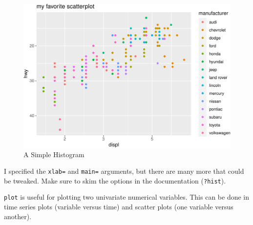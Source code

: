 \documentclass[
  12pt,
  krantz2]{krantz}
\makeatletter
\newenvironment{Shaded}{\begin{snugshade}}{\end{snugshade}}
\newcommand{\AttributeTok}[1]{\textcolor[rgb]{0.61,0.61,0.61}{#1}}
\newcommand{\DecValTok}[1]{\textcolor[rgb]{0.06,0.06,0.06}{#1}}
\newcommand{\FunctionTok}[1]{\textcolor[rgb]{0,0,0}{#1}}
\newcommand{\NormalTok}[1]{#1}
\newcommand{\SpecialCharTok}[1]{\textcolor[rgb]{0,0,0}{#1}}
\newcommand{\StringTok}[1]{\textcolor[rgb]{0.5,0.5,0.5}{#1}}
\newenvironment{kframe}{%
\medskip{}
\setlength{\fboxsep}{.8em}
 \def\at@end@of@kframe{}%
 \ifinner\ifhmode%
  \def\at@end@of@kframe{\end{minipage}}%
  \begin{minipage}{\columnwidth}%
 \fi\fi%
 \def\FrameCommand##1{\hskip\@totalleftmargin \hskip-\fboxsep
 \colorbox{shadecolor}{##1}\hskip-\fboxsep
     \hskip-\linewidth \hskip-\@totalleftmargin \hskip\columnwidth}%
 \MakeFramed {\advance\hsize-\width
   \@totalleftmargin\z@ \linewidth\hsize
   \@setminipage}}%
 {\par\unskip\endMakeFramed%
 \at@end@of@kframe}
\renewenvironment{Shaded}{\begin{kframe}}{\end{kframe}}
\makeatother
\begin{document}
\begin{figure}
\centering
\includegraphics{r_and_python_book_files/figure-latex/unnamed-chunk-196-1.pdf}
\caption{\label{fig:unnamed-chunk-196}A Simple Histogram}
\end{figure}

I specified the \texttt{xlab=} and \texttt{main=} arguments, but there are many more that could be tweaked. Make sure to skim the options in the documentation (\texttt{?hist}).

\texttt{plot} is useful for plotting two univariate numerical variables. This can be done in time series plots (variable versus time) and scatter plots (one variable versus another).

\begin{Shaded}
\end{Shaded}
\end{document}
